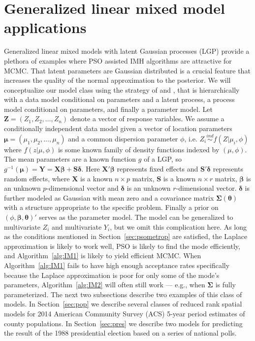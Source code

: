 \documentclass[12pt]{article}
\begin{document}
\section{Generalized linear mixed model applications}\label{sec:glm}
Generalized linear mixed models with latent Gaussian processes (LGP) provide a plethora of examples where PSO assisted IMH algorithms are attractive for MCMC. That latent parameters are Gaussian distributed is a crucial feature that increases the quality of the normal approximation to the posterior. We will conceptualize our model class using the strategy of \citet{berliner1996hierarchical} and \citet{wikle2003hierarchical}, that is hierarchically with a data model conditional on parameters and a latent process, a process model conditional on parameters, and finally a parameter model. Let $\bm{Z}=(Z_1,Z_2,\dots,Z_n)$ denote a vector of response variables. We assume a conditionally independent data model given a vector of location parameters $\bm{\mu} = (\mu_1, \mu_2, \dots, \mu_n)$ and a common dispersion parameter $\phi$, i.e. $Z_i \stackrel{ind}{\sim} f(Z|\mu_i,\phi)$ where $f(z|\mu,\phi)$ is some known family of density functions indexed by $(\mu, \phi)$. The mean parameters are a known function $g$ of a LGP, so $g^{-1}(\bm{\mu}) = \bm{Y} = \bm{X}\bm{\beta} + \bm{S}\bm{\delta}$. Here $\bm{X}'\bm{\beta}$ represents fixed effects and $\bm{S}'\bm{\delta}$ represents random effects, where $\bm{X}$ is a known $n\times p$ matrix, $\bm{S}$ is a known $n\times r$ matrix, $\bm{\beta}$ is an unknown $p$-dimensional vector and $\bm{\delta}$ is an unknown $r$-dimensional vector. $\bm{\delta}$ is further modeled as Gaussian with mean zero and a covariance matrix $\bm{\Sigma}(\bm{\theta})$ with a structure appropriate to the specific problem. Finally a prior on $(\phi, \bm{\beta}, \bm{\theta})'$ serves as the parameter model. The model can be generalized to multivariate $Z_i$ and multivariate $Y_i$, but we omit this complication here. As long as the conditions mentioned in Section~\ref{sec:psometrop} are satisfied, the Laplace approximation is likely to work well, PSO is likely to find the mode efficiently, and Algorithm~\ref{alg:IM1} is likely to yield efficient MCMC. When Algorithm~\ref{alg:IM1} fails to have high enough acceptance rates specifically because the Laplace approximation is poor for only some of the mode's parameters, Algorithm~\ref{alg:IM2} will often still work --- e.g., when $\bm{\Sigma}$ is fully parameterized. The next two subsections describe two examples of this class of models. In Section~\ref{sec:pop} we describe several classes of reduced rank spatial models for 2014 American Community Survey (ACS) 5-year period estimates of county populations. In Section~\ref{sec:pres} we describe two models for predicting the result of the 1988 presidential election based on a series of national polls.
\end{document}

